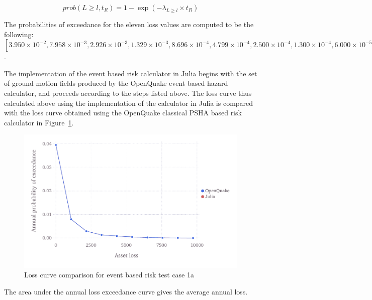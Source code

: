 \begin{equation}
	prob(L \geq l, t_R) = 1 - \exp (-\lambda_{L \geq l} \times t_R)
\end{equation}

The probabilities of exceedance for the eleven loss values are computed to be the following: $[3.950\times10^{-2}, 7.958\times10^{-3}, 2.926\times10^{-3}, 1.329\times10^{-3}, 8.696\times10^{-4}, 4.799\times10^{-4}, 2.500\times10^{-4}, 1.300\times10^{-4}, 6.000\times10^{-5}, 0.000]$.

The implementation of the event based risk calculator in Julia begins with the set of ground motion fields produced by the OpenQuake event based hazard calculator, and proceeds according to the steps listed above. The loss curve thus calculated above using the implementation of the calculator in Julia is compared with the loss curve obtained using the OpenQuake classical PSHA based risk calculator in Figure~\ref{fig:lc-ebr-1a}.

\begin{figure}[htbp]
\centering
\includegraphics[width=12cm]{qareport/figures/fig-lc-ebr-1a}
\caption{Loss curve comparison for event based risk test case 1a}
\label{fig:lc-ebr-1a}
\end{figure}

The area under the annual loss exceedance curve gives the average annual loss.